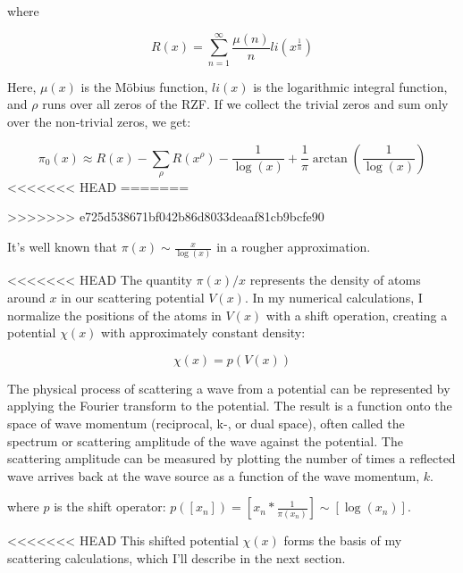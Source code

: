 \documentclass[11pt, oneside]{article}
\begin{document}
where

\begin{equation}
R(x) = \sum_{n=1}^{\infty}\frac{\mu(n)}{n}li(x^{\frac{1}{n}})
\end{equation}

Here, $\mu(x)$ is the Möbius function, $li(x)$ is the logarithmic integral function, and $\rho$ runs over all zeros of the RZF. If we collect the trivial zeros and sum only over the non-trivial zeros, we get:

\begin{equation}
\pi_0(x) \approx R(x) - \sum_{\rho}R(x^{\rho}) - \frac{1}{\log(x)} + \frac{1}{\pi}\arctan(\frac{1}{\log(x)})
\end{equation}
<<<<<<< HEAD
=======
 

>>>>>>> e725d538671bf042b86d8033deaaf81cb9bcfe90

It's well known that $\pi(x) \sim \frac{x}{\log(x)}$ in a rougher approximation.

<<<<<<< HEAD
The quantity $\pi(x)/x$ represents the density of atoms around $x$ in our scattering potential $V(x)$. In my numerical calculations, I normalize the positions of the atoms in $V(x)$ with a shift operation, creating a potential $\chi(x)$ with approximately constant density:

\begin{equation}
\chi(x) = p(V(x))
\end{equation}

The physical process of scattering a wave from a potential can be represented by applying the Fourier transform to the potential. The result is a function onto the space of wave momentum (reciprocal, k-, or dual space), often called the spectrum or scattering amplitude of the wave against the potential. The scattering amplitude can be measured by plotting the number of times a reflected wave arrives back at the wave source as a function of the wave momentum, $k$.

where $p$ is the shift operator: $p([x_n]) = [x_n * \frac{1}{\pi(x_n)}] \sim [\log(x_n)]$.

<<<<<<< HEAD
This shifted potential $\chi(x)$ forms the basis of my scattering calculations, which I'll describe in the next section.
\end{document}
